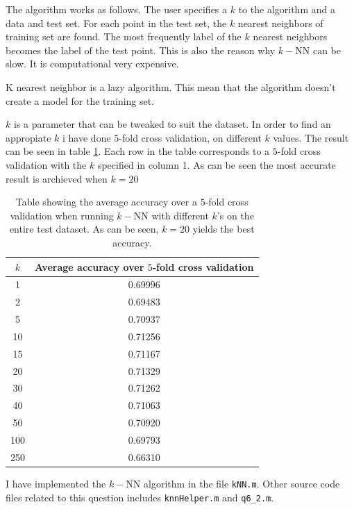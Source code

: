 \documentclass[10pt]{article}
\begin{document}
The algorithm works as follows. The user specifies a $k$ to the algorithm and a data and test set. For each point in the test set, the $k$ nearest neighbors of training set are found. The most frequently label of the $k$ nearest neighbors becomes the label of the test point. This is also the reason why $k-$NN can be slow. It is computational very expensive.

K nearest neighbor is a lazy algorithm. This mean that the algorithm doesn't create a model for the training set. 

$k$ is a parameter that can be tweaked to suit the dataset. In order to find an appropiate $k$ i have done $5$-fold cross validation, on different $k$ values. The result can be seen in table \ref{table2}. Each row in the table corresponds to a $5$-fold cross validation with the $k$ specified in column 1. As can be seen the most accurate result is archieved when $k=20$

\begin{table}
  \begin{center}  
    \begin{tabular}{ | c | c |}
      \hline
      $k$ & Average accuracy over $5$-fold cross validation\\
      \hline
        1    &     0.69996\\
        2    &     0.69483\\
        5    &     0.70937\\
       10    &     0.71256\\
       15    &     0.71167\\
       20    &     0.71329\\
       30    &     0.71262\\
       40    &     0.71063\\
       50    &     0.70920\\
      100    &     0.69793\\
      250    &     0.66310\\        
      \hline
    \end{tabular}
    \caption{Table showing the average accuracy over a $5$-fold cross validation when running $k-$NN with different $k$'s on the entire test dataset. As can be seen, $k=20$ yields the best accuracy.}
    \label{table2}
  \end{center}    
\end{table}   

I have implemented the $k-$NN algorithm in the file \texttt{kNN.m}. Other source code files related to this question includes \texttt{knnHelper.m} and \texttt{q6_2.m}.
\end{document}
